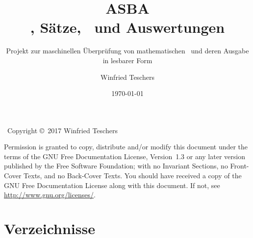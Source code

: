 \titlehead{
	{\Large Dr. Winfried Teschers}\\
	Anton-Günther-Straße 26c\\91083 Baiersdorf\\
	{\footnotesize winfried.teschers@t-online.de}
}
\subject{Projektdokument}
\title{{\Huge ASBA}\\\Axiome, Sätze, \Beweise\ und Auswertungen}
\subtitle{Projekt zur maschinellen Überprüfung von mathematischen \Beweisen\ und deren Ausgabe in lesbarer Form}
\author{Winfried Teschers}
\date{\today}
\publishers{\vspace{1cm}\normalsize
	Es wird ein Programmsystem beschrieben, das zu eingegebenen \Axiomen, Sätzen, und \Beweisen\ letztere prüft, Auswertungen generiert und zu gegebenen \Ausgabeschemata\ eine Ausgabe der Elemente in üblicher Formelschreibweise im \LaTeX-Format erstellt.
}



	\maketitle

	~\vfill Copyright \copyright\ 2017 Winfried Teschers\bigskip

	Permission is granted to copy, distribute and/or modify this document under the terms of the GNU Free Documentation License, Version~1.3 or any later version published by the Free Software Foundation; with no Invariant Sections, no Front-Cover Texts, and no Back-Cover Texts.
	You should have received a copy of the GNU Free Documentation License along with this document.
	If not, see \url{http://www.gnu.org/licenses/}.

	\tableofcontents
	\Endchapter

	
	
	
	
	

	\chapter{Verzeichnisse}%
	\label{cha:Verzeichnisse}

	\likechapter[section]{\listtablename}
	\begin{minipage}{\linewidth-10.95pt}
		\label{dic:Tabellenverzeichnis}
		\listoftables
	\end{minipage}
	\Endchapter

